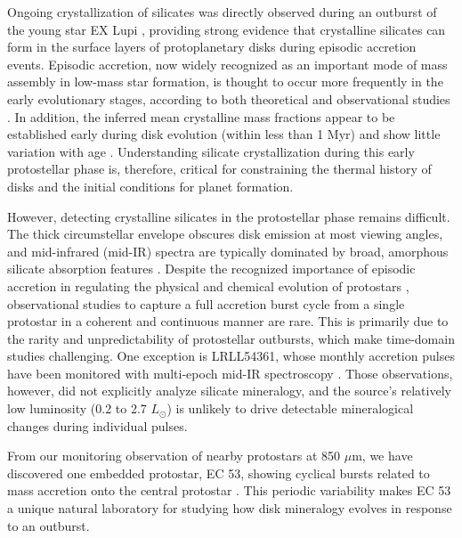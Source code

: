 \documentclass[pdflatex,sn-mathphys-num]{sn-jnl}
\theoremstyle{thmstyleone}
\theoremstyle{thmstyletwo}
\theoremstyle{thmstylethree}
\begin{document}
\begin{bibunit}
Ongoing crystallization of silicates was directly observed during an outburst of the young star EX Lupi \citep{Abraham2009}, providing strong evidence that crystalline silicates can form in the surface layers of protoplanetary disks during episodic accretion events. Episodic accretion, now widely recognized as an important mode of mass assembly in low-mass star formation, is thought to occur more frequently in the early evolutionary stages, according to both theoretical and observational studies \citep{Bae2014, Park2021}.
In addition, the inferred mean crystalline mass fractions appear to be established early during disk evolution (within less than 1 Myr) and show little variation with age \citep{Sicilia-Aguilar2009, Oliveira2011}. Understanding silicate crystallization during this early protostellar phase is, therefore, critical for constraining the thermal history of disks and the initial conditions for planet formation.

However, detecting crystalline silicates in the protostellar phase remains difficult. The thick circumstellar envelope obscures disk emission at most viewing angles, and mid-infrared (mid-IR) spectra are typically dominated by broad, amorphous silicate absorption features \citep{Quanz2007, Yang2022}. Despite the recognized importance of episodic accretion in regulating the physical and chemical evolution of protostars \citep{jeLee2019, jeLee2023, jeLee2025}, observational studies to capture a full accretion burst cycle from a single protostar in a coherent and continuous manner are rare. This is primarily due to the rarity and unpredictability of protostellar outbursts, which make time-domain studies challenging. One exception is LRLL54361, whose monthly accretion pulses have been monitored with multi-epoch mid-IR spectroscopy \citep{Muzerolle2013}. Those observations, however, did not explicitly analyze silicate mineralogy, and the source’s relatively low luminosity (0.2 to 2.7 $L_\odot$) is unlikely to drive detectable mineralogical changes during individual pulses.

From our monitoring observation of nearby protostars at 850 $\mu$m, we have discovered one embedded protostar, EC 53, showing cyclical bursts related to mass accretion onto the central protostar \citep{yoo2017, yhLee2020}. This periodic variability makes EC 53 a unique natural laboratory for studying how disk mineralogy evolves in response to an outburst.


\end{bibunit}
\end{document}
